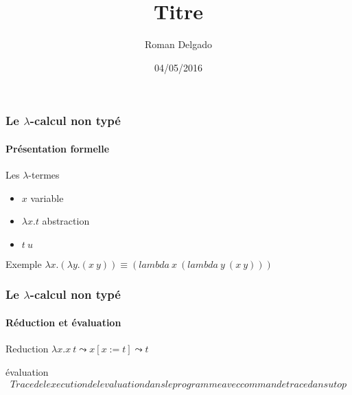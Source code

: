 \documentclass{beamer}
\title{Titre}
\author{Roman Delgado}
\institute[\textsc{Upmc}]{Université Pierre et Marie Curie}
\date{04/05/2016}
\newcommand{\Lam}[2]{\ensuremath{\lambda #1. #2}}
\newcommand{\App}[2]{\ensuremath{#1\:#2}}
\newcommand{\Var}[1]{\ensuremath{#1}}
\newcommand{\subst}[3]{#1[#2 := #3]}
\begin{document}
\begin{frame}

\titlepage

\end{frame}


\begin{frame}

\frametitle{Le $\lambda$-calcul non typé}
\framesubtitle{Présentation formelle} 


\begin{block}{Les $\lambda$-termes}
  \begin{itemize}
  \item $x$ \mbox{variable}
  \item $\lambda x.t$ \mbox{abstraction}
  \item $t\:u$
  \end{itemize}
\end{block}

\begin{block}{Exemple}
  $\Lam{x}{(\Lam{y}{(\App{x}{y})})}\equiv(lambda\:x\:(lambda\:y\:(x\:y)))$
\end{block}

\end{frame}
\begin{frame}
\frametitle{Le $\lambda$-calcul non typé}
\framesubtitle{Réduction et évaluation}

\begin{block}{Reduction}
  $\App{\Lam{x}{x}}{t}\leadsto \subst{x}{x}{t} \leadsto \Var{t}$
\end{block}

\begin{block}{évaluation}
  \begin{align*}
    Trace de lexecution de levaluation dans le programme
    avec commande trace dans utop
  \end{align*} 
\end{block}

\end{frame}
\end{document}
